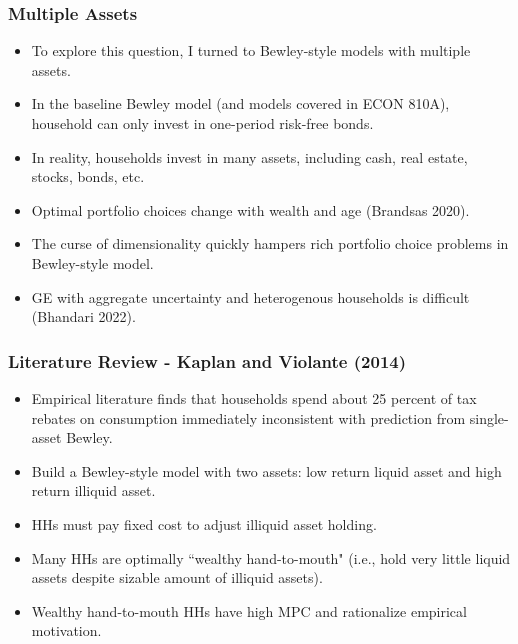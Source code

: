 \documentclass{beamer}
\begin{document}
\begin{frame}
\frametitle{Multiple Assets}
\begin{itemize}[<+->]
\item To explore this question, I turned to Bewley-style models with multiple assets.
\bigskip
\item In the baseline Bewley model (and models covered in ECON 810A), household can only invest in one-period risk-free bonds.
\bigskip
\item In reality, households invest in many assets, including cash, real estate, stocks, bonds, etc.
\bigskip
\item Optimal portfolio choices change with wealth and age (Brandsas 2020).
\bigskip
\item The curse of dimensionality quickly hampers rich portfolio choice problems in Bewley-style model.
\bigskip
\item GE with aggregate uncertainty and heterogenous households is difficult (Bhandari 2022).
\end{itemize}
\end{frame}





\begin{frame}
\frametitle{Literature Review - Kaplan and Violante (2014)}


\begin{itemize}[<+->]
\item Empirical literature finds that households spend about 25 percent of tax rebates on consumption immediately inconsistent with prediction from single-asset Bewley.
\bigskip
\item Build a Bewley-style model with two assets: low return liquid asset and high return illiquid asset.
\bigskip
\item HHs must pay fixed cost to adjust illiquid asset holding.
\bigskip
\item Many HHs are optimally ``wealthy hand-to-mouth" (i.e., hold very little liquid assets despite sizable amount of illiquid assets).
\bigskip
\item Wealthy hand-to-mouth HHs have high MPC and rationalize empirical motivation.
\end{itemize}

\end{frame}
\end{document}
